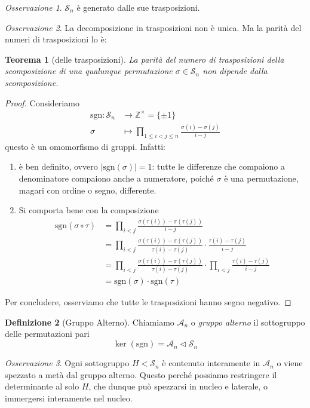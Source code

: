 \documentclass[a4paper]{article}
\newtheorem{theorem}{Teorema}[section]
\theoremstyle{remark}
\newtheorem*{remark}{Osservazione}
\theoremstyle{definition}
\newtheorem{definition}[theorem]{Definizione}
\newcommand{\fun}[5]{\begin{align*}
	#1 \colon #2 &\to #3 \\
	#4 &\mapsto #5
	\end{align*}}
\begin{document}
\begin{multicols}{2}
\begin{remark}
	$ \mathcal{S}_n $ è generato dalle sue trasposizioni.
\end{remark}
\begin{remark}
	La decomposizione in trasposizioni non è unica. Ma la parità del numeri di trasposizioni lo è:
\end{remark}
\begin{theorem}[delle trasposizioni]
	La parità del numero di trasposizioni della scomposizione di una qualunque permutazione $ \sigma \in \mathcal{S}_n $ non dipende dalla scomposizione.
\end{theorem}
\begin{proof}
	Consideriamo
	\fun{\text{sgn}}{\mathcal{S}_n}{\mathbb{Z}^\times = \{\pm 1\}}{\sigma}{\prod_{1 \leq i < j \leq n}\frac{\sigma(i)-\sigma(j)}{i-j}}
	questo è un omomorfismo di gruppi. Infatti:
	\begin{enumerate}
		\item è ben definito, ovvero $ |\text{sgn}(\sigma)| = 1 $: tutte le differenze che compaiono a denominatore compaiono anche a numeratore, poiché $ \sigma $ è una permutazione, magari con ordine o segno, differente.
		\item Si comporta bene con la composizione
		\begin{align*}
			\text{sgn}(\sigma \circ \tau) &= \prod_{i < j}\frac{\sigma(\tau(i))-\sigma(\tau(j))}{i-j} \\
			& = \prod_{i < j}\frac{\sigma(\tau(i))-\sigma(\tau(j))}{\tau(i)-\tau(j)}\cdot \frac{\tau(i)-\tau(j)}{i-j} \\
			& = \prod_{i < j}\frac{\sigma(\tau(i))-\sigma(\tau(j))}{\tau(i)-\tau(j)}\cdot\prod_{i < j} \frac{\tau(i)-\tau(j)}{i-j}\\
			& = \text{sgn}(\sigma)\cdot \text{sgn}(\tau)
		\end{align*}
	\end{enumerate}
	Per concludere, osserviamo che tutte le trasposizioni hanno segno negativo. 
\end{proof}
\begin{definition}[Gruppo Alterno]
	Chiamiamo $ \mathcal{A}_n $ o \emph{gruppo alterno} il sottogruppo delle permutazioni pari
	\[ \ker(\text{sgn}) = \mathcal{A}_n \lhd \mathcal{S}_n \]
\end{definition}
\begin{remark}
	Ogni sottogruppo $ H < \mathcal{S}_n $ è contenuto interamente in $ \mathcal{A}_n $ o viene spezzato a metà dal gruppo alterno. Questo perché possiamo restringere il determinante al solo $ H $, che dunque può spezzarsi in nucleo e laterale, o immergersi interamente nel nucleo.
\end{remark}


\end{multicols}
\end{document}
